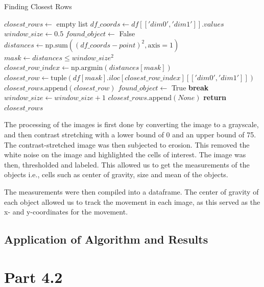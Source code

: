 \documentclass{article}
\begin{document}
\begin{algorithm}[h!]
\caption{Finding Closest Rows}\label{find-closest-rows}
\begin{algorithmic}[1]
    \State $closest\_rows \gets$ empty list
    \State $df\_coords \gets df[['dim0', 'dim1']].values$
        \State $window\_size \gets 0.5$
        \State $found\_object \gets$ False
            \State $distances \gets \text{np.sum}((df\_coords - point)^2, \text{axis}=1)$
            \State $mask \gets distances \leq window\_size^2$
                \State $closest\_row\_index \gets \text{np.argmin}(distances[mask])$
                \State $closest\_row \gets \text{tuple}(df[mask].iloc[closest\_row\_index][['dim0', 'dim1']])$
                \State $closest\_rows.\text{append}(closest\_row)$
                \State $found\_object \gets$ True
                \State \textbf{break}
            \EndIf
            \State $window\_size \gets window\_size + 1$
        \EndWhile
            \State $closest\_rows.\text{append}(None)$  
        \EndIf
    \EndFor
    \State \textbf{return} $closest\_rows$
\EndFunction
\end{algorithmic}
\end{algorithm}
\par The processing of the images is first done by converting the image to a grayscale, and then contrast stretching with a lower bound of 0 and an upper bound of 75. The contrast-stretched image was then subjected to erosion. This removed the white noise on the image and highlighted the cells of interest. The image was then, thresholded and labeled. This allowed us to get the measurements of the objects i.e., cells such as center of gravity, size and mean of the objects. 
\par The measurements were then compiled into a dataframe. The center of gravity of each object allowed us to track the movement in each image, as this served as the x- and y-coordinates for the movement. 
\subsection*{Application of Algorithm and Results}

\section*{Part 4.2}
\end{document}
